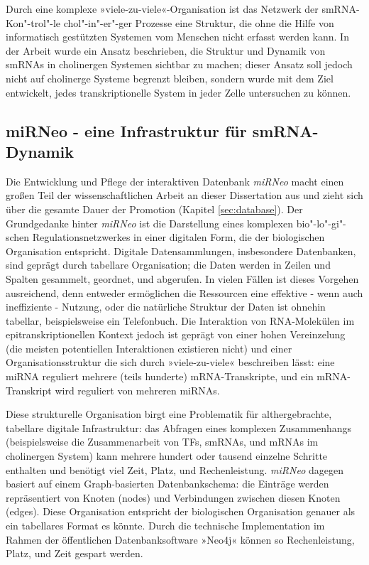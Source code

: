 Durch eine komplexe »viele-zu-viele«-Organisation ist das Netzwerk der smRNA-Kon"-trol"-le chol"-in"-er"-ger Prozesse eine Struktur, die ohne die Hilfe von informatisch gestützten Systemen vom Menschen nicht erfasst werden kann. In der Arbeit wurde ein Ansatz beschrieben, die Struktur und Dynamik von smRNAs in cholinergen Systemen sichtbar zu machen; dieser Ansatz soll jedoch nicht auf cholinerge Systeme begrenzt bleiben, sondern wurde mit dem Ziel entwickelt, jedes transkriptionelle System in jeder Zelle untersuchen zu können.

\subsection{miRNeo - eine Infrastruktur für smRNA-Dynamik}
Die Entwicklung und Pflege der interaktiven Datenbank \emph{miRNeo} macht einen großen Teil der wissenschaftlichen Arbeit an dieser Dissertation aus und zieht sich über die gesamte Dauer der Promotion (Kapitel \ref{sec:database}). Der Grundgedanke hinter \emph{miRNeo} ist die Darstellung eines komplexen bio"-lo"-gi"-schen Regulationsnetzwerkes in einer digitalen Form, die der biologischen Organisation entspricht. Digitale Datensammlungen, insbesondere Datenbanken, sind geprägt durch tabellare Organisation; die Daten werden in Zeilen und Spalten gesammelt, geordnet, und abgerufen. In vielen Fällen ist dieses Vorgehen ausreichend, denn entweder ermöglichen die Ressourcen eine effektive - wenn auch ineffiziente - Nutzung, oder die natürliche Struktur der Daten ist ohnehin tabellar, beispielsweise ein Telefonbuch. Die Interaktion von RNA-Molekülen im epitranskriptionellen Kontext jedoch ist geprägt von einer hohen Vereinzelung (die meisten potentiellen Interaktionen existieren nicht) und einer Organisationsstruktur die sich durch »viele-zu-viele« beschreiben lässt: eine miRNA reguliert mehrere (teils hunderte) mRNA-Transkripte, und ein mRNA-Transkript wird reguliert von mehreren miRNAs.

Diese strukturelle Organisation birgt eine Problematik für althergebrachte, tabellare digitale Infrastruktur: das Abfragen eines komplexen Zusammenhangs (beispielsweise die Zusammenarbeit von TFs, smRNAs, und mRNAs im cholinergen System) kann mehrere hundert oder tausend einzelne Schritte enthalten und benötigt viel Zeit, Platz, und Rechenleistung. \emph{miRNeo} dagegen basiert auf einem Graph-basierten Datenbankschema: die Einträge werden repräsentiert von Knoten (nodes) und Verbindungen zwischen diesen Knoten (edges). Diese Organisation entspricht der biologischen Organisation genauer als ein tabellares Format es könnte. Durch die technische Implementation im Rahmen der öffentlichen Datenbanksoftware »Neo4j« können so Rechenleistung, Platz, und Zeit gespart werden.

